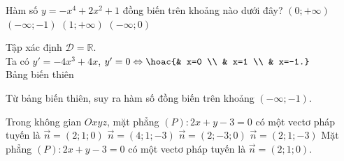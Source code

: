 \begin{ex}%
Hàm số $y=-x^4+2x^2+1$ đồng biến trên khoảng nào dưới đây?
\choice
{$(0;+\infty)$}
{\True $(-\infty;-1)$}
{$(1;+\infty)$}
{$(-\infty;0)$}
\loigiai
{
Tập xác định $\mathscr{D}=\mathbb{R}$.\\
Ta có $y'=-4x^3+4x$, $y'=0\Leftrightarrow \hoac{& x=0 \\ & x=1 \\ & x=-1.}$\\
Bảng biến thiên
\begin{center}
\end{center}
Từ bảng biến thiên, suy ra hàm số đồng biến trên khoảng $(-\infty;-1)$.
}
\end{ex}

\begin{ex}%
Trong không gian $O x y z$, mặt phẳng $(P)\colon 2x+y-3=0$ có một vectơ pháp tuyến là
\choice
{\True $\overrightarrow{n}=(2;1;0)$}
{$\overrightarrow{n}=(4;1;-3)$}
{$\overrightarrow{n}=(2;-3;0)$}
{$\overrightarrow{n}=(2;1;-3)$}
\loigiai
{
Mặt phẳng $(P)\colon 2x+y-3=0$ có một vectơ pháp tuyến là $\overrightarrow{n}=(2;1;0)$.
}
\end{ex}

